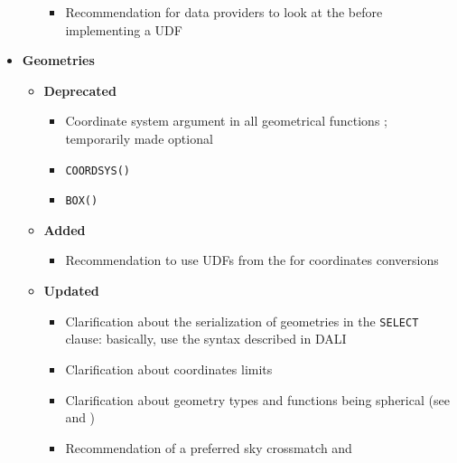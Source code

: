 \documentclass[11pt,a4paper]{ivoa}
\begin{document}
\begin{itemize}
\begin{itemize}
\begin{itemize}
                    \item Recommendation for data providers to look at the
                          \CatalogueUDF{} before implementing a UDF
                \end{itemize}
        \end{itemize}
    \item \textbf{Geometries}
        \begin{itemize}
            \item \textbf{Deprecated}
                \begin{itemize}
                    \item Coordinate system argument in all geometrical
                          functions ; temporarily made optional
                    \item \verb:COORDSYS(): 
                    \item \verb:BOX(): 
                \end{itemize}
            \item \textbf{Added}
                \begin{itemize}
                    \item Recommendation to use UDFs from the \CatalogueUDF{}
                          for coordinates conversions
                \end{itemize}
            \item \textbf{Updated}
                \begin{itemize}
                    \item Clarification about the serialization of geometries in
                          the \verb:SELECT: clause: basically, use the syntax
                          described in DALI 
                    \item Clarification about coordinates limits
                    \item Clarification about geometry types and functions being
                          spherical
                          (see  and
                          )
                    \item Recommendation of a preferred sky crossmatch and

\end{itemize}
\end{itemize}
\end{itemize}
\end{document}
